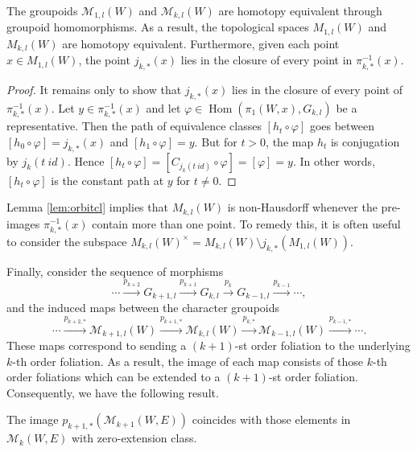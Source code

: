 \documentclass[10pt]{amsart}
\newcommand{\Hom}{\operatorname{Hom}}
\numberwithin{theoremalpha}{section}
\numberwithin{equation}{section}
\numberwithin{definition}{section}
\numberwithin{theorem}{section}
\numberwithin{proposition}{section}
\numberwithin{lemma}{section}
\numberwithin{example}{section}
\numberwithin{remark}{section}
\numberwithin{corollary}{section}
\numberwithin{question}{section}
\numberwithin{problem}{section}
\numberwithin{assumption}{section}
\theoremstyle{named}
\numberwithin{equation}{section}
\begin{document}
\begin{lemma} \label{lem:orbitcl}
The groupoids $\mathcal{M}_{1,l}(W)$ and $\mathcal{M}_{k,l}(W)$ are homotopy equivalent through groupoid homomorphisms. As a result, the topological spaces $M_{1,l}(W)$ and $M_{k,l}(W)$ are homotopy equivalent. Furthermore, given each point $x \in M_{1,l}(W)$, the point $j_{k,*}(x)$ lies in the closure of every point in $\pi_{k,*}^{-1}(x)$.
\end{lemma}
\begin{proof}
It remains only to show that $j_{k,*}(x)$ lies in the closure of every point of $\pi_{k,*}^{-1}(x)$. Let $y \in \pi_{k,*}^{-1}(x)$ and let $\varphi \in \Hom(\pi_1(W, x), G_{k,l})$ be a representative. Then the path of equivalence classes $[h_{t} \circ \varphi]$ goes between $[h_{0} \circ \varphi] = j_{k,*}(x)$ and $[h_1 \circ \varphi] = y$. But for $t > 0$, the map $h_t$ is conjugation by $j_{k}(t \ id)$. Hence $[h_{t} \circ \varphi] = [C_{j_{k}(t \ id)} \circ \varphi] = [\varphi] = y$. In other words, $[h_{t} \circ \varphi]$ is the constant path at $y$ for $t \neq 0$.
\end{proof}
\begin{remark}
Lemma \ref{lem:orbitcl} implies that $M_{k,l}(W)$ is non-Hausdorff whenever the pre-images $\pi_{k,*}^{-1}(x)$ contain more than one point. To remedy this, it is often useful to consider the subspace $M_{k,l}(W)^{\times} = M_{k,l}(W) \setminus j_{k,*}(M_{1,l}(W))$.
\end{remark}

Finally, consider the sequence of morphisms
\begin{equation*}
\cdots  \overset{p_{k+2}}{\rightarrow}  G_{k+1,l}  \overset{p_{k+1}}{\rightarrow}  G_{k,l}  \overset{p_{k}}{\rightarrow}  G_{k-1,l}  \overset{p_{k-1}}{\rightarrow} \cdots,
\end{equation*}
and the induced maps between the character groupoids
\begin{equation*}
\cdots \overset{p_{k+2,*}}{\rightarrow} \mathcal{M}_{k+1,l}(W) \overset{p_{k+1,*}}{\rightarrow}\mathcal{M}_{k,l}(W) \overset{p_{k,*}}{\rightarrow} \mathcal{M}_{k-1,l}(W) \overset{p_{k-1,*}}{\rightarrow} \cdots.
\end{equation*}
These maps correspond to sending a $(k+1)$-st order foliation to the underlying $k$-th order foliation. As a result, the image of each map consists of those $k$-th order foliations which can be extended to a $(k+1)$-st order foliation. Consequently, we have the following result. 
\begin{corollary}\label{cor:extimage}
The image $p_{k+1,*}(\mathcal{M}_{k+1}(W,E))$ coincides with those elements in $\mathcal{M}_{k}(W,E)$ with zero-extension class.
\end{corollary}
\end{document}
